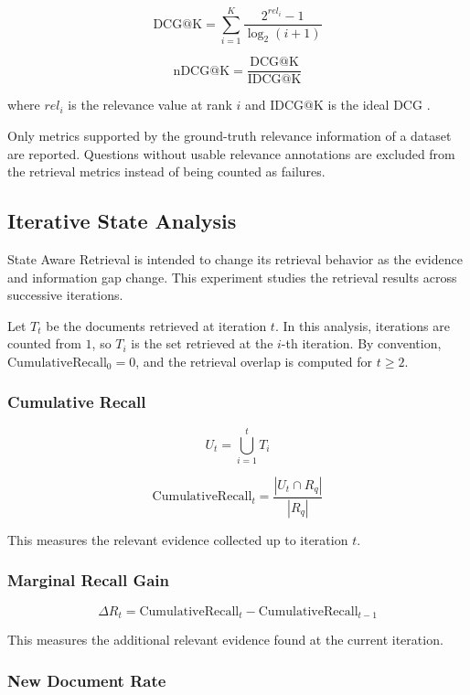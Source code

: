 \documentclass[12pt,a4paper]{report}
\begin{document}
\[
\mathrm{DCG@K}
=
\sum_{i=1}^{K}
\frac{2^{rel_i}-1}
{\log_2(i+1)}
\]

\[
\mathrm{nDCG@K}
=
\frac{\mathrm{DCG@K}}
{\mathrm{IDCG@K}}
\]

where $rel_i$ is the relevance value at rank $i$ and
$\mathrm{IDCG@K}$ is the ideal DCG \cite{jarvelin2002cumulated}.

Only metrics supported by the ground-truth relevance information of a
dataset are reported. Questions without usable relevance annotations are excluded from the retrieval metrics instead of being counted as failures.

\subsection{Iterative State Analysis}

State Aware Retrieval is intended to change its retrieval behavior as
the evidence and information gap change. This experiment studies the
retrieval results across successive iterations.

Let $T_t$ be the documents retrieved at iteration $t$. In this analysis, iterations are counted from $1$, so $T_i$ is the set retrieved at the $i$-th iteration. By convention, $\mathrm{CumulativeRecall}_0=0$, and the retrieval overlap is computed for $t\geq2$.

\subsubsection{Cumulative Recall}

\[
U_t
=
\bigcup_{i=1}^{t}T_i
\]

\[
\mathrm{CumulativeRecall}_t
=
\frac{|U_t\cap R_q|}
{|R_q|}
\]

This measures the relevant evidence collected up to iteration $t$.

\subsubsection{Marginal Recall Gain}

\[
\Delta R_t
=
\mathrm{CumulativeRecall}_t
-
\mathrm{CumulativeRecall}_{t-1}
\]

This measures the additional relevant evidence found at the current
iteration.

\subsubsection{New Document Rate}
\end{document}
